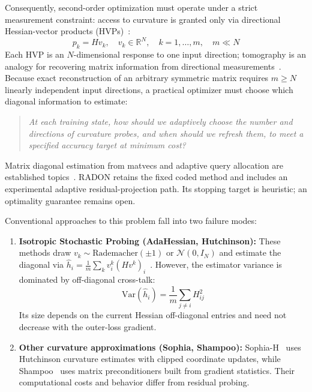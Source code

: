 \documentclass[11pt,a4paper]{article}
\theoremstyle{definition}
\theoremstyle{remark}
\begin{document}
Consequently, second-order optimization must operate under a strict measurement constraint: access to curvature is granted only via directional Hessian-vector products (HVPs)~\cite{martens2010deep}:
\begin{equation}
p_k = H v_k, \quad v_k \in \mathbb{R}^N, \quad k = 1, \dots, m, \quad m \ll N
\end{equation}
Each HVP is an $N$-dimensional response to one input direction; tomography is an analogy for recovering matrix information from directional measurements~\cite{radon1917bestimmung}. Because exact reconstruction of an arbitrary symmetric matrix requires $m \ge N$ linearly independent input directions, a practical optimizer must choose which diagonal information to estimate:
\begin{quote}
\textit{At each training state, how should we adaptively choose the number and directions of curvature probes, and when should we refresh them, to meet a specified accuracy target at minimum cost?}
\end{quote}
Matrix diagonal estimation from matvecs and adaptive query allocation are established topics~\cite{baston2022stochastic,han2024adaptive}. RADON retains the fixed coded method and includes an experimental adaptive residual-projection path. Its stopping target is heuristic; an optimality guarantee remains open.

Conventional approaches to this problem fall into two failure modes:
\begin{enumerate}
    \item \textbf{Isotropic Stochastic Probing (AdaHessian, Hutchinson):} These methods draw $v_k \sim \mathrm{Rademacher}(\pm 1)$ or $\mathcal{N}(0, I_N)$ and estimate the diagonal via $\hat{h}_i = \frac{1}{m} \sum_k v_i^k (H v^k)_i$~\cite{hutchinson1990stochastic,yao2021adahessian}. However, the estimator variance is dominated by off-diagonal cross-talk:
    \begin{equation}
    \mathrm{Var}(\hat{h}_i) = \frac{1}{m} \sum_{j \neq i} H_{ij}^2
    \end{equation}
    Its size depends on the current Hessian off-diagonal entries and need not decrease with the outer-loss gradient.
    \item \textbf{Other curvature approximations (Sophia, Shampoo):} Sophia-H~\cite{liu2023sophia} uses Hutchinson curvature estimates with clipped coordinate updates, while Shampoo~\cite{gupta2018shampoo} uses matrix preconditioners built from gradient statistics. Their computational costs and behavior differ from residual probing.
\end{enumerate}
\end{document}
